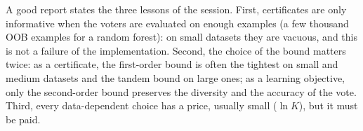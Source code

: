 \documentclass[11pt]{article}
\begin{document}
\begin{solution}
A good report states the three lessons of the session. First, certificates are only informative when the voters
are evaluated on enough examples (a few thousand OOB examples for a random forest): on small datasets they are
vacuous, and this is not a failure of the implementation. Second, the choice of the bound matters twice: as a
certificate, the first-order bound is often the tightest on small and medium datasets and the tandem bound on large
ones; as a learning objective, only the second-order bound preserves the diversity and the accuracy of the vote.
Third, every data-dependent choice has a price, usually small ($\ln K$), but it must be paid.
\end{solution}
\end{document}
